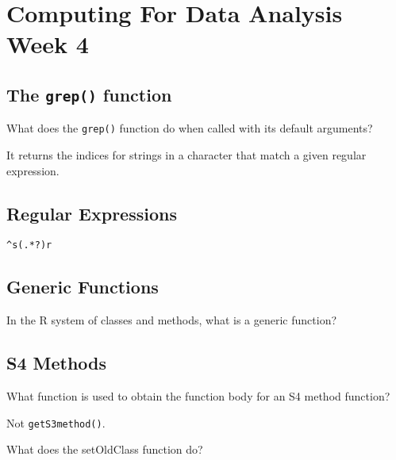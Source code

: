 
\section{Computing For Data Analysis Week 4}

\subsection{The \texttt{grep()} function }
 What does the \texttt{grep()} function do when called with its default arguments?
 
 It returns the indices for strings in a character that match a given regular expression.

\subsection{Regular Expressions}
\begin{framed}
\begin{verbatim}
^s(.*?)r
\end{verbatim}
\end{framed}
\subsection{Generic Functions}
In the R system of classes and methods, what is a generic function?


\subsection{S4 Methods}
What function is used to obtain the function body for an S4 method function?

Not \texttt{getS3method()}. 

What does the setOldClass function do?


